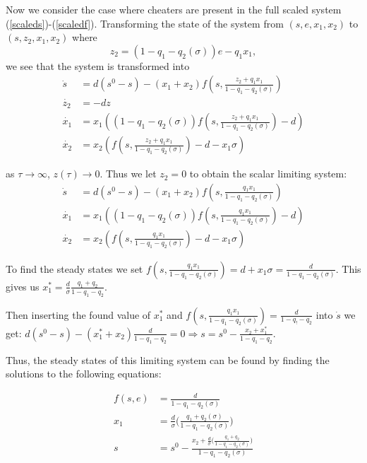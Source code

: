\documentclass[12pt]{article}
\begin{document}
\pagebreak

\noindent Now we consider the case where cheaters are present in the full scaled system (\ref{scaleds})-(\ref{scaledf}). Transforming the state of the system from $(s,e,x_1,x_2)$ to $(s,z_2,x_1,x_2)$ where $$z_2=(1-q_1-q_2(\sigma ))e-q_1x_1,$$ we see that the system is transformed into
\begin{align*}
\dot{s}&=d(s^0-s)-(x_1+x_2)f(s,\frac{z_2+q_1 x_1}{1-q_1-q_2(\sigma )})\\
\dot{z_2}&=-dz\\
\dot{x_1}&=x_1((1-q_1-q_2(\sigma ))f(s,{\frac{z_2+q_1 x_1}{1-q_1-q_2(\sigma )}})-d)\\
\dot{x_2}&=x_2(f(s,{\frac{z_2+q_1 x_1}{1-q_1-q_2(\sigma )}})-d-x_1 \sigma)
\end{align*}

\noindent as $\tau \rightarrow \infty$, $z(\tau )\rightarrow 0$. Thus we let $z_2=0$ to obtain the scalar limiting system: 
\begin{align}
\dot{s}&=d(s^0-s)-(x_1+x_2)f(s,\frac{q_1 x_1}{1-q_1-q_2(\sigma )})\\
\dot{x_1}&=x_1((1-q_1-q_2(\sigma ))f(s,\frac{q_1 x_1}{1-q_1-q_2(\sigma )})-d)\\
\dot{x_2}&=x_2(f(s,\frac{q_1 x_1}{1-q_1-q_2(\sigma )})-d-x_1 \sigma)
\end{align}

\noindent To find the steady states we set $f(s,\frac{q_1 x_1}{1-q_1-q_2(\sigma )})=d+x_1 \sigma = \frac{d}{1-q_1-q_2(\sigma )}$. This gives us $x_1^*=\frac{d}{\sigma}\frac{q_1+q_2}{1-q_1-q_2}$. 

\noindent Then inserting the found value of $x_1^*$ and $f(s,\frac{q_1 x_1}{1-q_1-q_2(\sigma )})=\frac{d}{1-q_!-q_2}$ into $\dot{s}$ we get: $d(s^0-s)-(x_1^*+x_2)\frac{d}{1-q_1-q_2}=0 \Rightarrow s=s^0-\frac{x_2+x_1^*}{1-q_1-q_2}$. 


\noindent Thus, the steady states of this limiting system can be found by finding the solutions to the following equations: 

\begin{align*}
f(s,e)&=\frac{d}{1-q_1-q_2(\sigma)}\\
x_1&= \frac{d}{\sigma} \big( \frac{q_1+q_2(\sigma )}{1-q_1-q_2(\sigma )}\big) \\
s &= s^0 - \frac{x_2+\frac{d}{\sigma}\big( \frac{q_1+q_2}{1-q_1-q_2(\sigma )} \big)}{1-q_1-q_2(\sigma )}
\end{align*}
\end{document}
